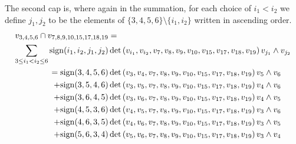 \begin{example}
The second cap is, where again in the summation, for each choice of $i_1 < i_2$ we define $j_1,j_{2}$ to be the elements of $\{3,4,5,6\} \setminus \{i_1,i_2\}$ written in ascending order. 
\begin{align*}
v_{3,4,5,6} \cap v_{7,8,9,10,15,17,18,19} &= \\ \sum_{3\leq i_1 < i_2\leq 6} {\rm sign}(i_1,i_2,j_1,j_2) &\det\left(v_{i_1},v_{i_2}, v_{7}, v_{8}, v_{9}, v_{10}, v_{15}, v_{17}, v_{18}, v_{19}\right)v_{j_1} \wedge v_{j_{2}}\nonumber \\
= {\rm sign}(3,4,5,6) &\det\left(v_3,v_4, v_{7}, v_{8}, v_{9}, v_{10}, v_{15}, v_{17}, v_{18}, v_{19}\right)v_5 \wedge  v_6 \nonumber \\
+ {\rm sign}(3,5,4,6) &\det\left(v_{3},v_5, v_7, v_8, v_9, v_{10}, v_{15}, v_{17}, v_{18}, v_{19}\right)v_4 \wedge v_6 \nonumber \\
+ {\rm sign}(3,6,4,5) &\det\left(v_3,v_6, v_7, v_8, v_9, v_{10}, v_{15}, v_{17}, v_{18}, v_{19}\right)v_4 \wedge v_5 \nonumber \\
+ {\rm sign}(4,5,3,6) &\det\left(v_4,v_5,v_7, v_8, v_9, v_{10}, v_{15}, v_{17}, v_{18}, v_{19}\right)v_3 \wedge v_6 \nonumber \\
+ {\rm sign}(4,6,3,5) &\det\left(v_4,v_6,v_7, v_8, v_9, v_{10}, v_{15}, v_{17}, v_{18}, v_{19}\right)v_3 \wedge v_5 \nonumber \\
+ {\rm sign}(5,6,3,4) &\det\left(v_5,v_6,v_7, v_8, v_9, v_{10}, v_{15}, v_{17}, v_{18}, v_{19}\right) v_3 \wedge v_4 \nonumber
\end{align*}



\end{example}
